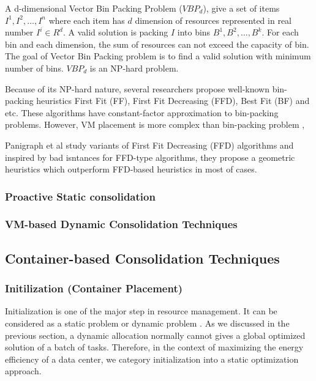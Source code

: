 A d-dimensional Vector Bin Packing Problem ($VBP_d$), give a set of items $I^1, I^2, \dots, I^n$ where each item has $d$ dimension of resources represented in real number $I^i \in R^d$. A valid solution is packing $I$ into bins $B^1, B^2, \dots, B^k$. For each bin and each dimension, the sum of resources can not exceed the capacity of bin. The goal of Vector Bin Packing problem is to find a valid solution with minimum number of bins. $VBP_d$ is an NP-hard problem.

Because of its NP-hard nature, several researchers propose well-known bin-packing heuristics
First Fit (FF), First Fit Decreasing (FFD), Best Fit (BF) and etc. These algorithms have constant-factor approximation to bin-packing problems. However, VM placement is more complex than bin-packing problem \cite{Mann:2015ua}, 

Panigraph et al \cite{Panigrahy:2011wk} study variants of First Fit Decreasing (FFD) algorithms and inspired by bad isntances for FFD-type algorithms, they propose a geometric heuristics which outperform FFD-based heuristics in most of cases.

\subsubsection{Proactive Static consolidation}

\subsubsection{VM-based Dynamic Consolidation Techniques}
\label{sec:dynamic}

\subsection{Container-based Consolidation Techniques}
\subsubsection{Initilization (Container Placement)}
Initialization is one of the major step in resource management. It can be considered as a static problem \cite{Jennings:2015ht} or dynamic problem \cite{Beloglazov:2012bw}. 
As we discussed in the previous section, a dynamic allocation normally cannot gives a global optimized solution of a batch of tasks. Therefore, in the context of maximizing the energy efficiency of a data center, we category initialization into a static optimization approach.

